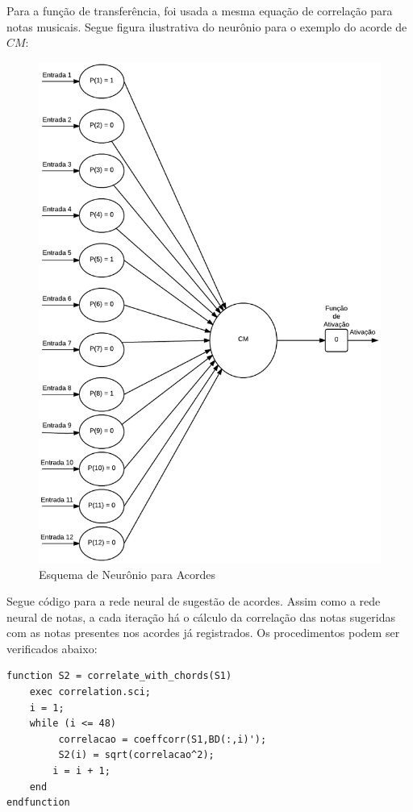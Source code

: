 Para a função de transferência, foi usada a mesma equação de correlação para notas musicais. Segue figura ilustrativa do neurônio para o exemplo do acorde de $CM$:

\begin{figure}[t]
	\centering
		\includegraphics[keepaspectratio=true,scale=0.25]{figuras/neuron_chord}
	\caption{Esquema de Neurônio para Acordes}
\end{figure}


\newpage
Segue código para a rede neural de sugestão de acordes. Assim como a rede neural de notas, a cada iteração há o cálculo da correlação das notas sugeridas com as notas presentes nos acordes já registrados. Os procedimentos podem ser verificados abaixo:

\begin{lstlisting} 
function S2 = correlate_with_chords(S1)
	exec correlation.sci;
	i = 1;
	while (i <= 48)
	     correlacao = coeffcorr(S1,BD(:,i)');
	     S2(i) = sqrt(correlacao^2);    
	    i = i + 1;
	end
endfunction
\end{lstlisting}

